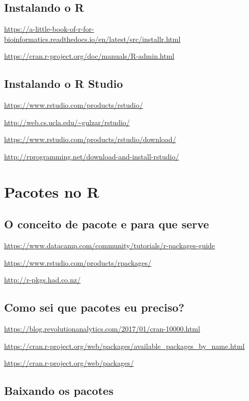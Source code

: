 \documentclass[12pt,a4paper,oneside]{erdc}\usepackage[]{graphicx}\usepackage[]{color}
\begin{document}
\subsection{Instalando o R}

\url{https://a-little-book-of-r-for-bioinformatics.readthedocs.io/en/latest/src/installr.html}

\url{https://cran.r-project.org/doc/manuals/R-admin.html}


\subsection{Instalando o R Studio}

\url{https://www.rstudio.com/products/rstudio/}

\url{http://web.cs.ucla.edu/~gulzar/rstudio/}

\url{https://www.rstudio.com/products/rstudio/download/}

\url{http://rprogramming.net/download-and-install-rstudio/}

\section{Pacotes no R}

\subsection{O conceito de pacote e para que serve}

\url{https://www.datacamp.com/community/tutorials/r-packages-guide}

\url{https://www.rstudio.com/products/rpackages/}

\url{http://r-pkgs.had.co.nz/}

\subsection{Como sei que pacotes eu preciso?}

\url{https://blog.revolutionanalytics.com/2017/01/cran-10000.html}

\url{https://cran.r-project.org/web/packages/available_packages_by_name.html}

\url{https://cran.r-project.org/web/packages/}

\subsection{Baixando os pacotes}
\end{document}
